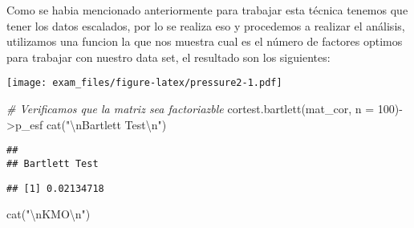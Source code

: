 \documentclass[
]{article}
\newenvironment{Shaded}{\begin{snugshade}}{\end{snugshade}}
\newcommand{\AttributeTok}[1]{\textcolor[rgb]{0.77,0.63,0.00}{#1}}
\newcommand{\CommentTok}[1]{\textcolor[rgb]{0.56,0.35,0.01}{\textit{#1}}}
\newcommand{\DecValTok}[1]{\textcolor[rgb]{0.00,0.00,0.81}{#1}}
\newcommand{\FunctionTok}[1]{\textcolor[rgb]{0.00,0.00,0.00}{#1}}
\newcommand{\NormalTok}[1]{#1}
\newcommand{\OtherTok}[1]{\textcolor[rgb]{0.56,0.35,0.01}{#1}}
\newcommand{\SpecialCharTok}[1]{\textcolor[rgb]{0.00,0.00,0.00}{#1}}
\newcommand{\StringTok}[1]{\textcolor[rgb]{0.31,0.60,0.02}{#1}}
\begin{document}
Como se habia mencionado anteriormente para trabajar esta técnica
tenemos que tener los datos escalados, por lo se realiza eso y
procedemos a realizar el análisis, utilizamos una funcion la que nos
muestra cual es el número de factores optimos para trabajar con nuestro
data set, el resultado son los siguientes:

\begin{Shaded}
\end{Shaded}

\texttt{[image: exam\_files/figure-latex/pressure2-1.pdf]}

\begin{Shaded}
\begin{Highlighting}[]
  \CommentTok{\# Verificamos que la matriz sea factoriazble}
  \FunctionTok{cortest.bartlett}\NormalTok{(mat\_cor, }\AttributeTok{n =} \DecValTok{100}\NormalTok{)}\OtherTok{{-}\textgreater{}}\NormalTok{p\_esf}
  \FunctionTok{cat}\NormalTok{(}\StringTok{"}\SpecialCharTok{\textbackslash{}n}\StringTok{Bartlett Test}\SpecialCharTok{\textbackslash{}n}\StringTok{"}\NormalTok{)}
\end{Highlighting}
\end{Shaded}

\begin{verbatim}
## 
## Bartlett Test
\end{verbatim}

\begin{Shaded}
\end{Shaded}

\begin{verbatim}
## [1] 0.02134718
\end{verbatim}

\begin{Shaded}
\begin{Highlighting}[]
  \FunctionTok{cat}\NormalTok{(}\StringTok{"}\SpecialCharTok{\textbackslash{}n}\StringTok{KMO}\SpecialCharTok{\textbackslash{}n}\StringTok{"}\NormalTok{)}
\end{Highlighting}
\end{Shaded}
\end{document}
